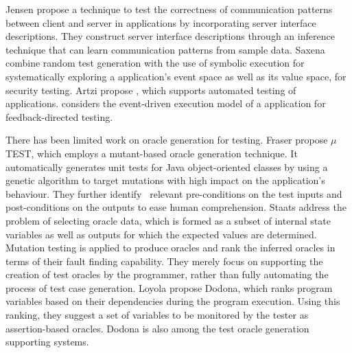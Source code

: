 Jensen \etal \cite{jensen:fse13} propose a technique to test the correctness of communication patterns between client and server in \ajax applications by incorporating server interface descriptions.
They construct server interface descriptions through an inference technique that can learn communication patterns from sample data.
Saxena \etal \cite{song:symb10} combine random test generation with the use of symbolic execution for systematically exploring a \javascript application's event space as well as its value space, for security testing.
Artzi \etal propose \artemis \cite{artzi:icse11}, which supports automated testing of \javascript applications.
\artemis considers the event-driven execution model of a \javascript application for feedback-directed testing.

 There has been limited work on oracle generation for testing. 
Fraser \etal \cite{fraser:tse12} propose $\mu$TE\-ST, which employs a mutant-based oracle generation technique.  It automatically generates unit tests for Java object-oriented classes by using a genetic algorithm to target mutations with high impact on the application's behaviour. They further identify~\cite{fraser:issta11} relevant pre-conditions on the test inputs and post-conditions on the outputs to ease human comprehension.
Staats \etal \cite{staats:icse12} address the problem of selecting oracle data,  which is formed as a subset of internal state variables as well as outputs for which the expected values are determined.
Mutation testing is applied to produce oracles and rank the inferred oracles in terms of their fault finding capability.
They merely focus on supporting the creation of test oracles by the programmer, rather than fully automating the process of test case generation.
Loyola \etal \cite{loyola:issta14} propose Dodona, which ranks program variables based on their dependencies during the program execution. Using this ranking, they suggest a set of variables to be monitored by the tester as assertion-based oracles. Dodona is also among the test oracle generation supporting systems.  

